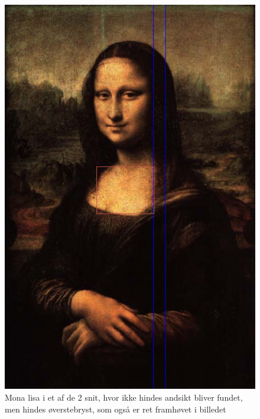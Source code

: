 \begin{figure}[h!!]
	\begin{center}
		\includegraphics[scale=0.50,angle=0]{afsnit/afprovning/billeder/BBMonalisacut0.png}
	\end{center}
	\caption[]{Mona lisa i et af de 2 snit, hvor ikke hindes andsikt bliver fundet, men hindes øverstebryst, som også er ret framhøvet i  billedet}
	\label{BBMonalisacut0}
\end{figure}

